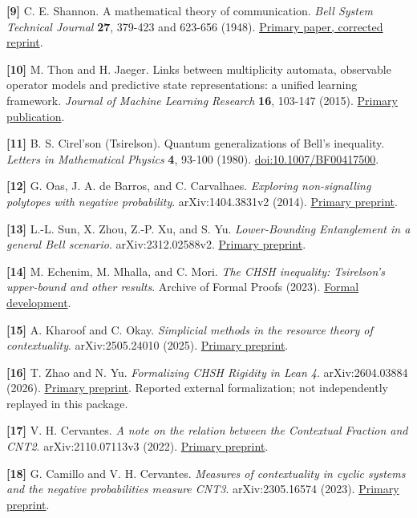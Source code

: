 \documentclass[
]{article}
\begin{document}
\textbf{{[}9{]}} C. E. Shannon. A mathematical theory of communication. \emph{Bell System Technical Journal} \textbf{27}, 379-423 and 623-656 (1948). \href{https://www.princeton.edu/~wbialek/rome/refs/shannon_48.pdf}{Primary paper, corrected reprint}.

\textbf{{[}10{]}} M. Thon and H. Jaeger. Links between multiplicity automata, observable operator models and predictive state representations: a unified learning framework. \emph{Journal of Machine Learning Research} \textbf{16}, 103-147 (2015). \href{https://www.jmlr.org/papers/v16/thon15a.html}{Primary publication}.

\textbf{{[}11{]}} B. S. Cirel'son (Tsirelson). Quantum generalizations of Bell's inequality. \emph{Letters in Mathematical Physics} \textbf{4}, 93-100 (1980). \href{https://doi.org/10.1007/BF00417500}{doi:10.1007/BF00417500}.

\textbf{{[}12{]}} G. Oas, J. A. de Barros, and C. Carvalhaes. \emph{Exploring non-signalling polytopes with negative probability}. arXiv:1404.3831v2 (2014). \href{https://arxiv.org/html/1404.3831v2}{Primary preprint}.

\textbf{{[}13{]}} L.-L. Sun, X. Zhou, Z.-P. Xu, and S. Yu. \emph{Lower-Bounding Entanglement in a general Bell scenario}. arXiv:2312.02588v2. \href{https://arxiv.org/html/2312.02588v2}{Primary preprint}.

\textbf{{[}14{]}} M. Echenim, M. Mhalla, and C. Mori. \emph{The CHSH inequality: Tsirelson's upper-bound and other results}. Archive of Formal Proofs (2023). \href{https://isa-afp.org/entries/TsirelsonBound.html}{Formal development}.

\textbf{{[}15{]}} A. Kharoof and C. Okay. \emph{Simplicial methods in the resource theory of contextuality}. arXiv:2505.24010 (2025). \href{https://arxiv.org/abs/2505.24010}{Primary preprint}.

\textbf{{[}16{]}} T. Zhao and N. Yu. \emph{Formalizing CHSH Rigidity in Lean 4}. arXiv:2604.03884 (2026). \href{https://arxiv.org/abs/2604.03884}{Primary preprint}. Reported external formalization; not independently replayed in this package.

\textbf{{[}17{]}} V. H. Cervantes. \emph{A note on the relation between the Contextual Fraction and CNT2}. arXiv:2110.07113v3 (2022). \href{https://arxiv.org/abs/2110.07113}{Primary preprint}.

\textbf{{[}18{]}} G. Camillo and V. H. Cervantes. \emph{Measures of contextuality in cyclic systems and the negative probabilities measure CNT3}. arXiv:2305.16574 (2023). \href{https://arxiv.org/abs/2305.16574}{Primary preprint}.
\end{document}
